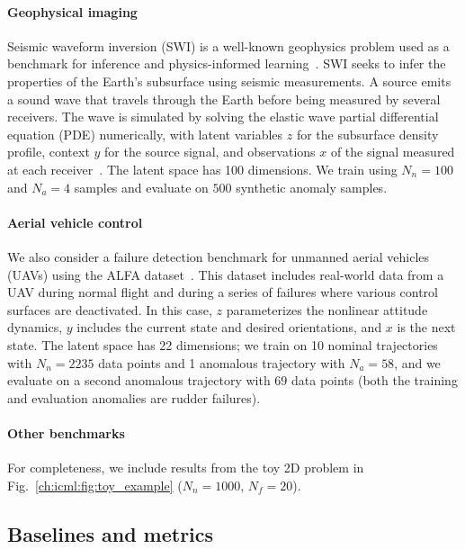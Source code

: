 \paragraph{Geophysical imaging} Seismic waveform inversion (SWI) is a well-known geophysics problem used as a benchmark for inference and physics-informed learning~\cite{gouveiaBayesianSeismicWaveform1998,dengOpenFWILargescaleMultistructural2022,zhangBayesianSpatialModelling2016}. SWI seeks to infer the properties of the Earth's subsurface using seismic measurements. A source emits a sound wave that travels through the Earth before being measured by several receivers. The wave is simulated by solving the elastic wave partial differential equation (PDE) numerically, with latent variables $z$ for the subsurface density profile, context $y$ for the source signal, and observations $x$ of the signal measured at each receiver~\cite{richardsonDeepwave2023}. The latent space has 100 dimensions. We train using $N_n = 100$ and $N_a = 4$ samples and evaluate on $500$ synthetic anomaly samples.

\paragraph{Aerial vehicle control} We also consider a failure detection benchmark for unmanned aerial vehicles (UAVs) using the ALFA dataset~\cite{keipourALFADatasetUAV2021}. This dataset includes real-world data from a UAV during normal flight and during a series of failures where various control surfaces are deactivated. In this case, $z$ parameterizes the nonlinear attitude dynamics, $y$ includes the current state and desired orientations, and $x$ is the next state. The latent space has 22 dimensions; we train on 10 nominal trajectories with $N_n = 2235$ data points and 1 anomalous trajectory with $N_a = 58$, and we evaluate on a second anomalous trajectory with $69$ data points (both the training and evaluation anomalies are rudder failures).

\paragraph{Other benchmarks} For completeness, we include results from the toy 2D problem in Fig.~\ref{ch:icml:fig:toy_example} ($N_n = 1000$, $N_f = 20$).

\subsection{Baselines and metrics}

